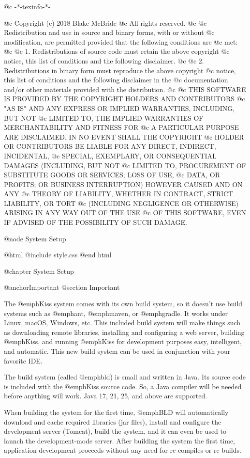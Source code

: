@c -*-texinfo-*-

@c  Copyright (c) 2018 Blake McBride
@c  All rights reserved.
@c
@c  Redistribution and use in source and binary forms, with or without
@c  modification, are permitted provided that the following conditions are
@c  met:
@c
@c  1. Redistributions of source code must retain the above copyright
@c  notice, this list of conditions and the following disclaimer.
@c
@c  2. Redistributions in binary form must reproduce the above copyright
@c  notice, this list of conditions and the following disclaimer in the
@c  documentation and/or other materials provided with the distribution.
@c
@c  THIS SOFTWARE IS PROVIDED BY THE COPYRIGHT HOLDERS AND CONTRIBUTORS
@c  "AS IS" AND ANY EXPRESS OR IMPLIED WARRANTIES, INCLUDING, BUT NOT
@c  LIMITED TO, THE IMPLIED WARRANTIES OF MERCHANTABILITY AND FITNESS FOR
@c  A PARTICULAR PURPOSE ARE DISCLAIMED. IN NO EVENT SHALL THE COPYRIGHT
@c  HOLDER OR CONTRIBUTORS BE LIABLE FOR ANY DIRECT, INDIRECT, INCIDENTAL,
@c  SPECIAL, EXEMPLARY, OR CONSEQUENTIAL DAMAGES (INCLUDING, BUT NOT
@c  LIMITED TO, PROCUREMENT OF SUBSTITUTE GOODS OR SERVICES; LOSS OF USE,
@c  DATA, OR PROFITS; OR BUSINESS INTERRUPTION) HOWEVER CAUSED AND ON ANY
@c  THEORY OF LIABILITY, WHETHER IN CONTRACT, STRICT LIABILITY, OR TORT
@c  (INCLUDING NEGLIGENCE OR OTHERWISE) ARISING IN ANY WAY OUT OF THE USE
@c  OF THIS SOFTWARE, EVEN IF ADVISED OF THE POSSIBILITY OF SUCH DAMAGE.


@node System Setup

@html
@include style.css
@end html

@chapter System Setup

@anchor{Important}
@section Important

The @emph{Kiss} system comes with its own build system, so it doesn't
use build systems such as @emph{ant}, @emph{maven}, or @emph{gradle}.
It works under Linux, macOS, Windows, etc. This included build system
will make things such as downloading remote libraries, installing and
configuring a web server, building @emph{Kiss}, and running
@emph{Kiss} for development purposes easy, intelligent, and automatic.
This new build system can be used in conjunction with your favorite IDE.

The build system (called @emph{bld}) is small and written in Java.
Its source code is included with the @emph{Kiss} source code.  So, a
Java compiler will be needed before anything will work.  
Java 17, 21, 25, and above are supported.

When building the system for the first time, @emph{BLD} will
automatically download and cache required libraries (jar files), install and
configure the development server (Tomcat), build the system, and it
can even be used to launch the development-mode server.  After building
the system the first time, application development proceeds without
any need for re-compiles or re-builds.

